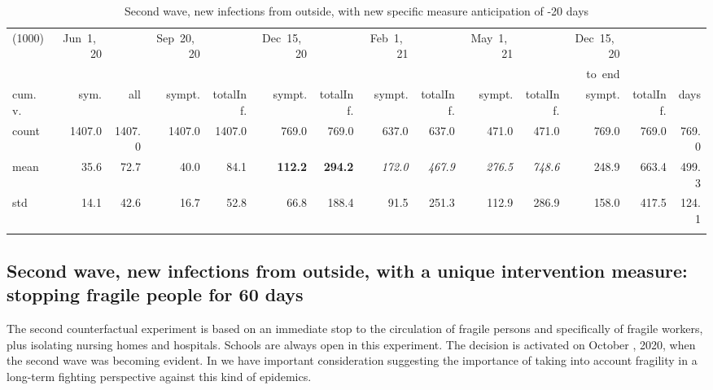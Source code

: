 \documentclass[graybox]{svmult}
\begin{document}
\begin{table}[t]
\center
\tiny
\begin{tabular}{lrrrrrrrrrrrrr}
\hline\noalign{\smallskip}
(1000) & Jun~1,~20 & & Sep~20,~20 & & Dec~15,~20 & & Feb~1,~21 & & May~1,~21 & & Dec~15,~20 \\
& & & & & & & & & & & to~end \\
cum.~v. & sym. & all & sympt. & totalInf. & sympt. & totalInf. & sympt. & totalInf. & sympt. & totalInf. & sympt. & totalInf. & days\\
\noalign{\smallskip}\svhline\noalign{\smallskip}
count & 1407.0 & 1407.0 & 1407.0 & 1407.0 & 769.0 & 769.0 & 637.0 & 637.0 & 471.0 & 471.0 & 769.0 & 769.0 & 769.0 \\
mean & 35.6 & 72.7 & 40.0 & 84.1 & \textbf{{\color{red}112.2}} & \textbf{{\color{red} 294.2}} & \emph{172.0} & \emph{467.9} & \emph{276.5} & \emph{748.6} & 248.9 & 663.4 & 499.3 \\
std & 14.1 & 42.6 & 16.7 & 52.8 & 66.8 & 188.4 & 91.5 & 251.3 & 112.9 & 286.9 & 158.0 & 417.5 & 124.1 \\
\hline\noalign{\smallskip}
\end{tabular}
\caption{Second wave, new infections from outside, with new specific measure anticipation of -20 days}
\label{selForceWave2Contr2M-20Tab}
\end{table}


\subsection{Second wave, new infections from outside, with a unique intervention measure: stopping fragile people for 60 days}
\label{frag}

The second counterfactual experiment is based on an immediate stop to the circulation of fragile persons and specifically of fragile workers, plus isolating nursing homes and hospitals. Schools are always open in this experiment. The decision is activated on October , 2020, when the second wave was becoming evident. 
In \cite{phillips2021coronavirus} we have important consideration suggesting the importance of taking into account fragility in a long-term fighting perspective against this kind of epidemics.
\end{document}
